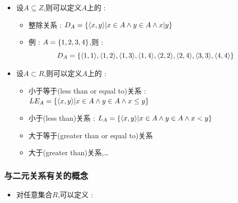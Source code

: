 {{{\begin{itemize}
{          \begin{itemize}
            \item 空关系 : $\emptyset$
            \item 恒等关系 : $I_A = \set{\dependent{x,x}| x \in A}$
            \item 全域关系 : $E_A = A \times A = \set{\dependent{x,y} | x \in A \land y \in A}$
            \item 包含关系 : $\subseteq_A = \set{\dependent{x,y}|x \subseteq \land y \subseteq A \land x \subseteq y}$
            \item 真包含关系 : $\subset_A = \set{\dependent{x,y} | x \subseteq A \land y \subseteq A \land x \subset y}$
          \end{itemize}
          }
    \item {
          设$A \subseteq Z$,则可以定义$A$上的 :

          \begin{itemize}
            \item 整除关系 : $D_A = \left\{ \langle x,y\rangle | x \in A \land y \in A \land x|y \right\}$
            \item {
                  例 : $A = \left\{ 1,2,3,4 \right\}$,则 : $$
                    D_A = \left\{ \langle1,1\rangle,\langle1,2\rangle,\langle1,3\rangle,\langle1,4\rangle,\langle2,2\rangle,\langle2,4\rangle,\langle3,3\rangle,\langle4,4\rangle \right\}
                  $$
                  }
          \end{itemize}
          }
    \item {
          设$A \subset R$,则可以定义$A$上的 :

          \begin{itemize}
            \item 小于等于(less than or equal to)关系 : $LE_A = \left\{ \langle x,y\rangle|x \in A \land y \in A \land x \leq y \right\}$
            \item 小于(less than)关系 : $L_A = \left\{ \langle x,y\rangle| x \in A \land y \in A \land x < y \right\}$
            \item 大于等于(greater than or equal to)关系
            \item 大于(greater than)关系,\dots
          \end{itemize}
          }
  \end{itemize}
}%

\subsubsection{与二元关系有关的概念}{
  \begin{itemize}
    \item {
          对任意集合$R$,可以定义 :

}
\end{itemize}}}}
